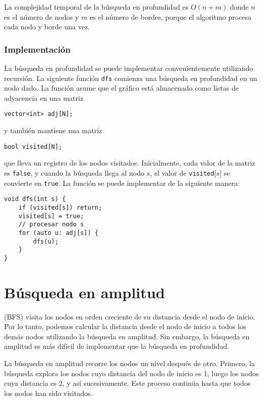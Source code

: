 La complejidad temporal de la búsqueda en profundidad es $O(n+m)$
donde $n$ es el número de nodos y $m$ es el
número de bordes,
porque el algoritmo procesa cada nodo y borde una vez.

\subsubsection*{Implementación}

La búsqueda en profundidad se puede implementar convenientemente
utilizando recursión.
La siguiente función \texttt{dfs} comienza
una búsqueda en profundidad en un nodo dado.
La función asume que el gráfico está
almacenado como listas de adyacencia en una matriz
\begin{lstlisting}
vector<int> adj[N];
\end{lstlisting}
y también mantiene una matriz
\begin{lstlisting}
bool visited[N];
\end{lstlisting}
que lleva un registro de los nodos visitados.
Inicialmente, cada valor de la matriz es \texttt{false},
y cuando la búsqueda llega al nodo $s$,
el valor de \texttt{visited}[$s$] se convierte en \texttt{true}.
La función se puede implementar de la siguiente manera:
\begin{lstlisting}
void dfs(int s) {
    if (visited[s]) return;
    visited[s] = true;
    // procesar nodo s
    for (auto u: adj[s]) {
        dfs(u);
    }
}
\end{lstlisting}

\section{Búsqueda en amplitud}


 (BFS) visita los nodos
en orden creciente de su distancia
desde el nodo de inicio.
Por lo tanto, podemos calcular la distancia
desde el nodo de inicio a todos los demás
nodos utilizando la búsqueda en amplitud.
Sin embargo, la búsqueda en amplitud es más difícil
de implementar que la búsqueda en profundidad.



La búsqueda en amplitud recorre los nodos
un nivel después de otro.
Primero, la búsqueda explora los nodos cuyo
distancia del nodo de inicio es 1,
luego los nodos cuya distancia es 2, y así sucesivamente.
Este proceso continúa hasta que todos los nodos
han sido visitados.

